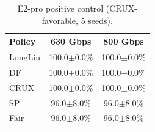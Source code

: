 \begin{table}[t]
\centering
\caption{E2-pro positive control (CRUX-favorable, 5 seeds).}
\label{tab:e2pro}
\small\begin{tabular}{lcc}\toprule
Policy & 630 Gbps & 800 Gbps \\\midrule
LongLiu & 100.0$\pm$0.0\% & 100.0$\pm$0.0\% \\
DF & 100.0$\pm$0.0\% & 100.0$\pm$0.0\% \\
CRUX & 100.0$\pm$0.0\% & 100.0$\pm$0.0\% \\
SP & 96.0$\pm$8.0\% & 96.0$\pm$8.0\% \\
Fair & 96.0$\pm$8.0\% & 96.0$\pm$8.0\% \\
\bottomrule\end{tabular}\end{table}
